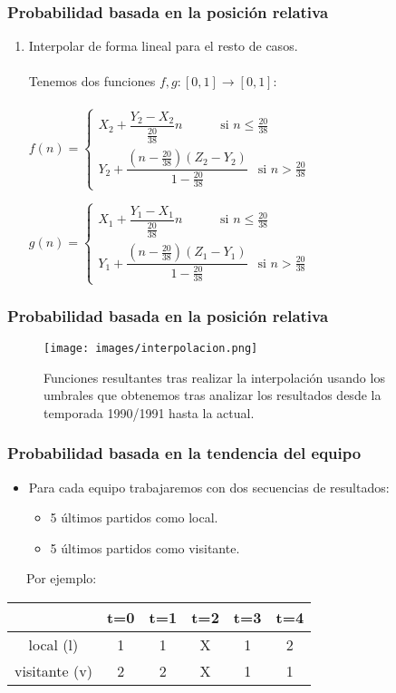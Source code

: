 \documentclass{beamer}
\newcounter{sauvegardeenumi}
\newcommand{\suite}{\setcounter{enumi}{\thesauvegardeenumi}}
\begin{document}
	\begin{frame}
		\frametitle{Probabilidad basada en la posición relativa}
		\begin{enumerate}
			\suite
			\item Interpolar de forma lineal para el resto de casos.\\
			\ \\
			Tenemos dos funciones $f,g:[0,1] \longrightarrow [0,1]$:\\
			\ \\
			$f(n)= \begin{cases}
			X_{2}+\dfrac{Y_{2}-X_{2}}{\frac{20}{38}}n \ \ \ \ \ \ \ \ \ \ \ \ \text{    si } n\leq \frac{20}{38} \\
			Y_{2}+\dfrac{(n-\frac{20}{38})(Z_{2}-Y_{2})}{1-\frac{20}{38}} \ \ \text{    si } n > \frac{20}{38}
			\end{cases}$
			
			$g(n)= \begin{cases}
			X_{1}+\dfrac{Y_{1}-X_{1}}{\frac{20}{38}}n \ \ \ \ \ \ \ \ \ \ \ \ \text{    si } n\leq \frac{20}{38} \\
			Y_{1}+\dfrac{(n-\frac{20}{38})(Z_{1}-Y_{1})}{1-\frac{20}{38}} \ \ \text{    si } n > \frac{20}{38}
			\end{cases}$    
		\end{enumerate}				
	\end{frame}

	\begin{frame}[label=interp]
		\frametitle{Probabilidad basada en la posición relativa}
		\begin{figure} 
			\centering
			\texttt{[image: images/interpolacion.png]}
			\caption{Funciones resultantes tras realizar la interpolación usando los umbrales que obtenemos tras analizar los resultados desde la temporada 1990/1991 hasta la actual.}
		\end{figure}			
	\end{frame}

	\begin{frame}
		\frametitle{Probabilidad basada en la tendencia del equipo}
		\begin{itemize}
			\item Para cada equipo trabajaremos con dos secuencias de resultados:
			\begin{itemize}
				\item 5 últimos partidos como local.
				\item 5 últimos partidos como visitante.
			\end{itemize}
		\end{itemize}
		\ \ \ Por ejemplo:	 
		\begin{center}
			\begin{tabular}{|c|c|c|c|c|c|}
				\hline  & t=0 & t=1 & t=2 & t=3 & t=4 \\ 
				\hline local (l)  & 1 & 1 & X & 1 & 2\\ 
				\hline visitante (v) & 2 & 2 & X & 1 & 1\\ 
				\hline 
			\end{tabular} 
		\end{center}
	\end{frame}
	
\end{document}
